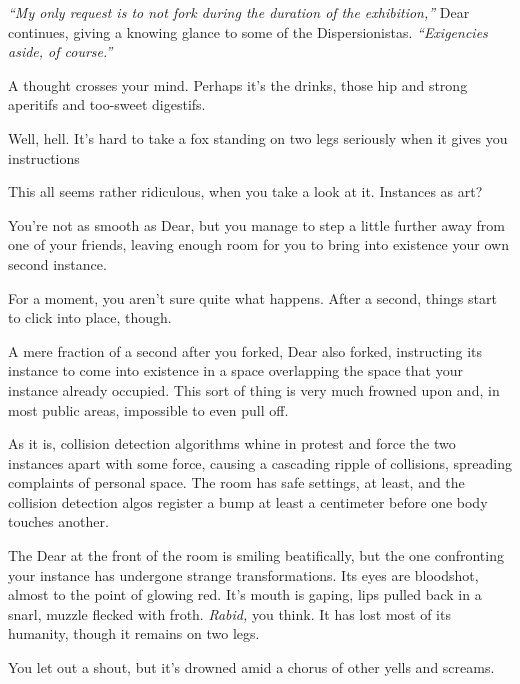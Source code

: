 \emph{``My only request is to not fork during the duration of the exhibition,''} Dear continues, giving a knowing glance to some of the Dispersionistas. \emph{``Exigencies aside, of course.''}

A thought crosses your mind. Perhaps it's the drinks, those hip and strong aperitifs and too-sweet digestifs.

\vfill

\newpage

\null
\vfill

Well, hell. It's hard to take a fox standing on two legs seriously when it gives you instructions

\vfill

\newpage
\null
\vfill

This all seems rather ridiculous, when you take a look at it. Instances as art?
\null
\vfill

\newpage
\null
\vfill

You're not as smooth as Dear, but you manage to step a little further away from one of your friends, leaving enough room for you to bring into existence your own second instance.
\null
\vfill

\newpage
\null
\vfill

For a moment, you aren't sure quite what happens. After a second, things start to click into place, though.

A mere fraction of a second after you forked, Dear also forked, instructing its instance to come into existence in a space overlapping the space that your instance already occupied. This sort of thing is very much frowned upon and, in most public areas, impossible to even pull off.

As it is, collision detection algorithms whine in protest and force the two instances apart with some force, causing a cascading ripple of collisions, spreading complaints of personal space. The room has safe settings, at least, and the collision detection algos register a bump at least a centimeter before one body touches another.

The Dear at the front of the room is smiling beatifically, but the one confronting your instance has undergone strange transformations. Its eyes are bloodshot, almost to the point of glowing red. It's mouth is gaping, lips pulled back in a snarl, muzzle flecked with froth. \emph{Rabid,} you think. It has lost most of its humanity, though it remains on two legs.

You let out a shout, but it's drowned amid a chorus of other yells and screams.

